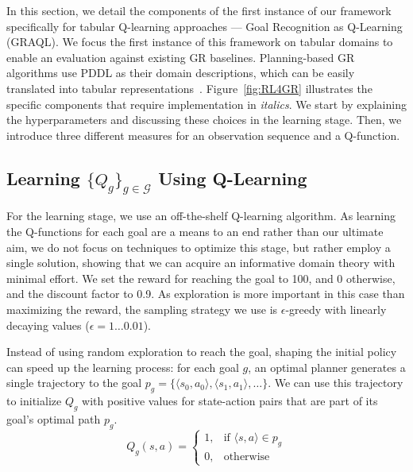\documentclass[letterpaper]{article} %
\providecommand\goals{\mathcal{G}}
\begin{document}
In this section, we detail the components of the first instance of our framework specifically for tabular Q-learning approaches --- Goal Recognition as Q-Learning (GRAQL). 
We focus the first instance of this framework on tabular domains to enable an evaluation against existing GR baselines. Planning-based GR algorithms use PDDL as their domain descriptions, which can be easily translated into tabular representations~\cite{ramirez2009plan,amado2018goal}.
Figure~\ref{fig:RL4GR} illustrates the specific components that require implementation in \textit{italics}. 
We start by explaining the hyperparameters and discussing these choices in the learning stage. 
Then, we introduce three different measures for an observation sequence and a Q-function.

\subsection{Learning $\{Q_g\}_{g\in \goals}$ Using Q-Learning}
For the learning stage, we use an off-the-shelf Q-learning algorithm.
As learning the Q-functions for each goal are a means to an end rather than our ultimate aim, we do not focus on techniques to optimize this stage, but rather employ a single solution, showing that we can acquire an informative domain theory with minimal effort. 
We set the reward for reaching the goal to 100, and 0 otherwise, and the discount factor to 0.9. 
As exploration is more important in this case than maximizing the reward, the sampling strategy we use is $\epsilon$-greedy with linearly decaying values ($\epsilon = 1 \ldots 0.01$). 

Instead of using random exploration to reach the goal, shaping the initial policy can speed up the learning process: for each goal $g$, an optimal planner generates a single trajectory to the goal $p_g = \{\langle s_0, a_0 \rangle, \langle s_1, a_1 \rangle, \ldots \}$. 
We can use this trajectory to initialize $Q_g$ with positive values for state-action pairs that are part of its goal's optimal path $p_g$.
%
\begin{equation}
    Q_g(s,a) =
    \begin{cases}
    1,& \text{if } \langle s,a \rangle \in p_g \\
    0,              & \text{otherwise}
\end{cases}
\end{equation}
\end{document}

